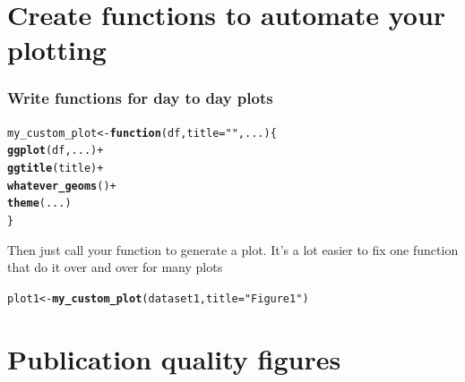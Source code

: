 \documentclass{beamer}\usepackage[]{graphicx}\usepackage[]{color}
\makeatletter
\newcommand{\hlstr}[1]{\textcolor[rgb]{0.192,0.494,0.8}{#1}}%
\newcommand{\hlopt}[1]{\textcolor[rgb]{0,0,0}{#1}}%
\newcommand{\hlstd}[1]{\textcolor[rgb]{0.345,0.345,0.345}{#1}}%
\newcommand{\hlkwa}[1]{\textcolor[rgb]{0.161,0.373,0.58}{\textbf{#1}}}%
\newcommand{\hlkwb}[1]{\textcolor[rgb]{0.69,0.353,0.396}{#1}}%
\newcommand{\hlkwc}[1]{\textcolor[rgb]{0.333,0.667,0.333}{#1}}%
\newcommand{\hlkwd}[1]{\textcolor[rgb]{0.737,0.353,0.396}{\textbf{#1}}}%
\newenvironment{kframe}{%
 \def\at@end@of@kframe{}%
 \ifinner\ifhmode%
  \def\at@end@of@kframe{\end{minipage}}%
  \begin{minipage}{\columnwidth}%
 \fi\fi%
 \def\FrameCommand##1{\hskip\@totalleftmargin \hskip-\fboxsep
 \colorbox{shadecolor}{##1}\hskip-\fboxsep
     \hskip-\linewidth \hskip-\@totalleftmargin \hskip\columnwidth}%
 \MakeFramed {\advance\hsize-\width
   \@totalleftmargin\z@ \linewidth\hsize
   \@setminipage}}%
 {\par\unskip\endMakeFramed%
 \at@end@of@kframe}
\newenvironment{knitrout}{}{} %
\makeatother
\begin{document}

\section*{Create functions to automate your plotting}
\frame{\sectionpage}


\begin{frame}[fragile]
\frametitle{Write functions for day to day plots}
\begin{knitrout}\footnotesize
{}\color{fgcolor}\begin{kframe}
\begin{alltt}
\hlstd{my_custom_plot} \hlkwb{<-} \hlkwa{function}\hlstd{(}\hlkwc{df}\hlstd{,} \hlkwc{title} \hlstd{=} \hlstr{""}\hlstd{,} \hlkwc{...}\hlstd{) \{}
    \hlkwd{ggplot}\hlstd{(df, ...)} \hlopt{+}
    \hlkwd{ggtitle}\hlstd{(title)} \hlopt{+}
    \hlkwd{whatever_geoms}\hlstd{()} \hlopt{+}
    \hlkwd{theme}\hlstd{(...)}
\hlstd{\}}
\end{alltt}
\end{kframe}
\end{knitrout}

Then just call your function to generate a plot.
It's a lot easier to fix one function that do it over and over for many plots
\begin{knitrout}\footnotesize
{}\color{fgcolor}\begin{kframe}
\begin{alltt}
\hlstd{plot1} \hlkwb{<-} \hlkwd{my_custom_plot}\hlstd{(dataset1,} \hlkwc{title} \hlstd{=} \hlstr{"Figure 1"}\hlstd{)}
\end{alltt}
\end{kframe}
\end{knitrout}

\end{frame}



\section*{Publication quality figures}
\frame{\sectionpage}
\end{document}
